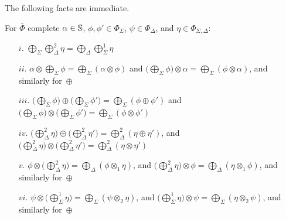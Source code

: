 \noindent
The following facts are immediate.
%
\begin{lemma}
For $\bar\Phi$ complete %
$\alpha \in \mathbb{S}$,
$\phi, \phi' \in \Phi_{\Sigma}$,
$\psi \in \Phi_{\Delta}$, and
$\eta \in \Phi_{\Sigma, \Delta}$:
%
\begin{enumerate}
\item[$i.$]
\( \bigoplus_{\Sigma}\bigoplus^2_{\Delta} \eta = \bigoplus_{\Delta}\bigoplus^1_{\Sigma} \eta \)
\item[$ii.$]
\( \alpha \otimes \bigoplus_{\Sigma} \phi = \bigoplus_{\Sigma} (\alpha \otimes \phi) \) and
\( \bigl( \bigoplus_{\Sigma} \phi \bigr) \otimes\alpha = \bigoplus_{\Sigma} (\phi \otimes \alpha) \),
and similarly for~$\oplus$
\item[$iii.$]
\( \bigl(\bigoplus_{\Sigma} \phi\bigr) \oplus \bigl(\bigoplus_{\Sigma} \phi'\bigr)
   = \bigoplus_{\Sigma} (\phi \oplus \phi') \) and
\( \bigl(\bigoplus_{\Sigma} \phi\bigr) \otimes \bigl(\bigoplus_{\Sigma} \phi'\bigr)
   = \bigoplus_{\Sigma} (\phi \otimes \phi') \)
\item[$iv.$]
\( \bigl(\bigoplus^2_{\Delta} \eta\bigr) \oplus \bigl(\bigoplus^2_{\Delta} \eta' \bigr) =
 \bigoplus^2_{\Delta} (\eta \oplus \eta') \), and
\( \bigl(\bigoplus^2_{\Delta} \eta\bigr) \otimes \bigl(\bigoplus^2_{\Delta} \eta' \bigr) =
 \bigoplus^2_{\Delta} (\eta \otimes \eta') \)
\item[$v.$]
\( \phi \otimes \bigl(\bigoplus^2_{\Delta} \eta\bigr) = \bigoplus_{\Delta} (\phi \otimes_1 \eta) \), and
\( \bigl(\bigoplus^2_{\Delta} \eta\bigr) \otimes \phi = \bigoplus_{\Delta} (\eta \otimes_1 \phi) \),
and similarly for~$\oplus$
\item[$vi.$]
\( \psi \otimes \bigl(\bigoplus^1_{\Sigma} \eta\bigr) = \bigoplus_{\Sigma} (\psi \otimes_2 \eta) \), and
\( \bigl(\bigoplus^1_{\Sigma} \eta\bigr) \otimes \psi = \bigoplus_{\Sigma} (\eta \otimes_2 \psi) \),
and similarly for~$\oplus$
\end{enumerate}
\end{lemma}



